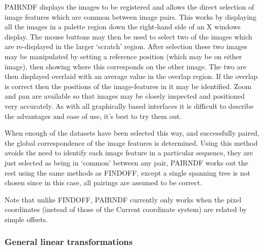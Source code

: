 \documentclass[twoside,11pt]{article}
\newcommand{\htmlref}[2]{#1}
\newcommand{\xlabel}[1]{}
\renewcommand{\_}{\texttt{\symbol{95}}}
\newcommand{\routine}[1]{{\sc #1}}
\newcommand{\xroutine}[1]{\htmlref{{\sc #1}}{#1}}
\begin{document}
\routine{PAIRNDF} displays the images to be registered and allows the direct
selection of image features which are common between image pairs.
This works by displaying all the images in a palette region down the
right-hand side of an X windows display. The mouse buttons may then be
used to select two of the images which are re-displayed in the larger
`scratch' region. After selection these two images may be manipulated
by setting a reference position (which may be on either image), then
showing where this corresponds on the other image. The two are then
displayed overlaid with an average value in the overlap region. If the
overlap is correct then the positions of the image-features in it may
be identified. Zoom and pan are available so that images may be
closely inspected and positioned very accurately. As with all
graphically based interfaces it is difficult to describe the
advantages and ease of use, it's best to try them out.

When enough of the datasets have been selected this way, and
successfully paired, the global correspondence of the image features
is determined. Using this method avoids the need to identify each
image feature in a particular sequence, they are just selected as
being in `common' between any pair, \routine{PAIRNDF} works out the rest using
the same methods as \xroutine{FINDOFF}, except a single spanning tree is not
chosen since in this case, all pairings are assumed to be correct.

Note that unlike \routine{FINDOFF}, 
\routine{PAIRNDF} currently only works when the pixel 
coordinates (instead of those of the Current coordinate system) are
related by simple offsets.

\subsubsection{\xlabel{usinglineartransforms}General linear transformations}
\end{document}
